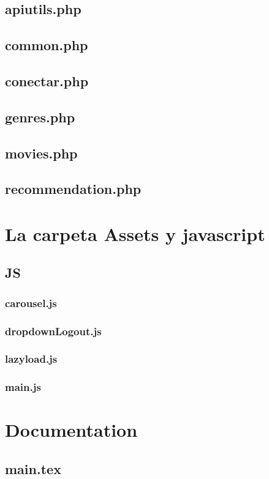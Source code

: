 \documentclass[a4paper, 12pt]{report}
\begin{document}
    \section{apiutils.php}
    \section{common.php}
    \section{conectar.php}
    \section{genres.php}
    \section{movies.php}
    \section{recommendation.php}

    \chapter{La carpeta Assets y javascript}
      \section{JS}
      \subsection{carousel.js}
      \subsection{dropdownLogout.js}
      \subsection{lazyload.js}
      \subsection{main.js}
      \chapter{Documentation}
      \section{main.tex}
\end{document}

